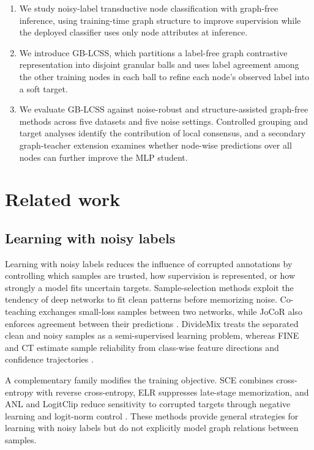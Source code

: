 \documentclass[10pt,letterpaper]{elsarticle}
\begin{document}
\begin{enumerate}
\item We study noisy-label transductive node classification with graph-free inference, using training-time graph structure to improve supervision while the deployed classifier uses only node attributes at inference.
\item We introduce GB-LCSS, which partitions a label-free graph contrastive representation into disjoint granular balls and uses label agreement among the other training nodes in each ball to refine each node's observed label into a soft target.
\item We evaluate GB-LCSS against noise-robust and structure-assisted graph-free methods across five datasets and five noise settings. Controlled grouping and target analyses identify the contribution of local consensus, and a secondary graph-teacher extension examines whether node-wise predictions over all nodes can further improve the MLP student.
\end{enumerate}

\FloatBarrier

\section{Related work}\label{sec:2}

\subsection{Learning with noisy labels}\label{sec:2.1}

Learning with noisy labels reduces the influence of corrupted annotations by controlling which samples are trusted, how supervision is represented, or how strongly a model fits uncertain targets. Sample-selection methods exploit the tendency of deep networks to fit clean patterns before memorizing noise. Co-teaching exchanges small-loss samples between two networks, while JoCoR also enforces agreement between their predictions \cite{ref17,ref18}. DivideMix treats the separated clean and noisy samples as a semi-supervised learning problem, whereas FINE and CT estimate sample reliability from class-wise feature directions and confidence trajectories \cite{ref23,ref24,ref25}.

A complementary family modifies the training objective. SCE combines cross-entropy with reverse cross-entropy, ELR suppresses late-stage memorization, and ANL and LogitClip reduce sensitivity to corrupted targets through negative learning and logit-norm control \cite{ref19,ref20,ref21,ref22}. These methods provide general strategies for learning with noisy labels but do not explicitly model graph relations between samples.
\end{document}
